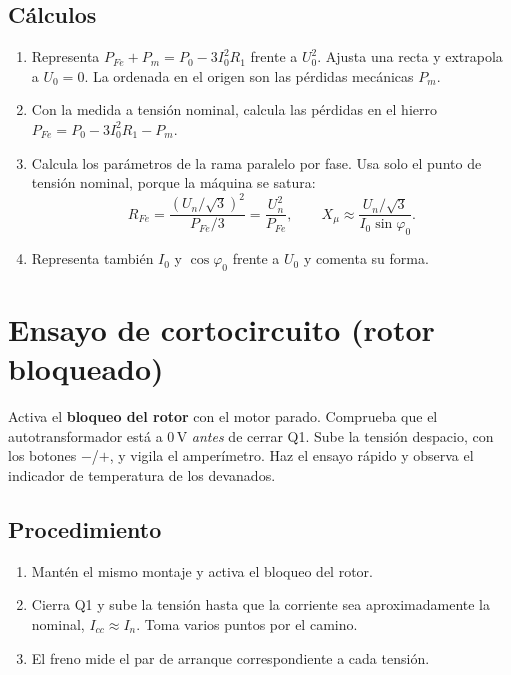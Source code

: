 \documentclass[11pt,a4paper]{article}
\begin{document}
\subsection*{Cálculos}
\begin{enumerate}
  \item Representa $P_{Fe} + P_m = P_0 - 3 I_0^2 R_1$ frente a $U_0^2$. Ajusta una recta y extrapola a $U_0 = 0$. La ordenada en el origen son las pérdidas mecánicas $P_m$.
  \item Con la medida a tensión nominal, calcula las pérdidas en el hierro $P_{Fe} = P_0 - 3I_0^2R_1 - P_m$.
  \item Calcula los parámetros de la rama paralelo por fase. Usa solo el punto de tensión nominal, porque la máquina se satura:
  \[
    R_{Fe} = \frac{(U_n/\sqrt3)^2}{P_{Fe}/3} = \frac{U_n^2}{P_{Fe}}, \qquad
    X_\mu \approx \frac{U_n/\sqrt3}{I_0 \sin\varphi_0}.
  \]
  \item Representa también $I_0$ y $\cos\varphi_0$ frente a $U_0$ y comenta su forma.
\end{enumerate}

\section{Ensayo de cortocircuito (rotor bloqueado)}
\begin{seguridad}
  Activa el \textbf{bloqueo del rotor} con el motor parado. Comprueba que el autotransformador está a 0\,V \emph{antes} de cerrar Q1. Sube la tensión despacio, con los botones $-$/$+$, y vigila el amperímetro. Haz el ensayo rápido y observa el indicador de temperatura de los devanados.
\end{seguridad}

\subsection*{Procedimiento}
\begin{enumerate}
  \item Mantén el mismo montaje y activa el bloqueo del rotor.
  \item Cierra Q1 y sube la tensión hasta que la corriente sea aproximadamente la nominal, $I_{cc} \approx I_n$. Toma varios puntos por el camino.
  \item El freno mide el par de arranque correspondiente a cada tensión.
\end{enumerate}
\end{document}
